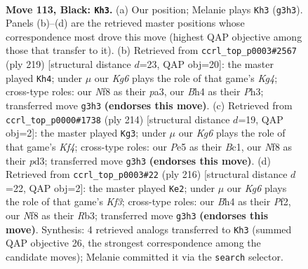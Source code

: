 \documentclass[11pt]{article}
\begin{document}
\clearpage

\begin{figure}[p]\centering
\begin{subfigure}{0.46\textwidth}\centering
\resizebox{\linewidth}{!}{%
\newchessgame
\chessboard[
  setfen={5n2/8/7p/r3p3/1R5b/3p2k1/1K6/8 b - - 23 113},
  showmover=false,
  pgfstyle=straightmove, color=movearrow, markmove={g3-h3}
]}
\caption{}
\end{subfigure}\hfill
\begin{subfigure}{0.46\textwidth}\centering
\resizebox{\linewidth}{!}{%
\newchessgame
\chessboard[
  setfen={8/8/1p6/1p4k1/8/P1K2R1p/7N/4r3 b - - 11 110},
  showmover=false,
  pgfstyle=straightmove, color=movearrow, markmove={g5-h4}
]}
\caption{}
\end{subfigure}
\\[4pt]
\begin{subfigure}{0.46\textwidth}\centering
\resizebox{\linewidth}{!}{%
\newchessgame
\chessboard[
  setfen={8/1R5P/6n1/3k3r/5K2/3p4/8/2B5 w - - 3 108},
  showmover=false,
  pgfstyle=straightmove, color=movearrow, markmove={f4-g3}
]}
\caption{}
\end{subfigure}\hfill
\begin{subfigure}{0.46\textwidth}\centering
\resizebox{\linewidth}{!}{%
\newchessgame
\chessboard[
  setfen={8/8/r4k2/7R/5P2/1R3K2/5P2/6r1 w - - 69 109},
  showmover=false,
  pgfstyle=straightmove, color=movearrow, markmove={f3-e2}
]}
\caption{}
\end{subfigure}
\caption{\textbf{Move 113, Black: \texttt{Kh3}.} (a) Our position; Melanie plays \texttt{Kh3} (\texttt{g3h3}). Panels (b)--(d) are the retrieved master positions whose correspondence most drove this move (highest QAP objective among those that transfer to it). (b) Retrieved from \texttt{ccrl\_top\_p0003\#2567} (ply 219) [structural distance $d$=23, QAP obj=20]: the master played \texttt{Kh4}; under $\mu$ our \emph{Kg6} plays the role of that game's \emph{Kg4}; cross-type roles: our \emph{N}f8 as their \emph{p}a3, our \emph{B}h4 as their \emph{P}h3; transferred move \texttt{g3h3} \textbf{(endorses this move)}. (c) Retrieved from \texttt{ccrl\_top\_p0000\#1738} (ply 214) [structural distance $d$=19, QAP obj=2]: the master played \texttt{Kg3}; under $\mu$ our \emph{Kg6} plays the role of that game's \emph{Kf4}; cross-type roles: our \emph{P}e5 as their \emph{B}c1, our \emph{N}f8 as their \emph{p}d3; transferred move \texttt{g3h3} \textbf{(endorses this move)}. (d) Retrieved from \texttt{ccrl\_top\_p0003\#22} (ply 216) [structural distance $d$=22, QAP obj=2]: the master played \texttt{Ke2}; under $\mu$ our \emph{Kg6} plays the role of that game's \emph{Kf3}; cross-type roles: our \emph{B}h4 as their \emph{P}f2, our \emph{N}f8 as their \emph{R}b3; transferred move \texttt{g3h3} \textbf{(endorses this move)}. Synthesis: 4 retrieved analogs transferred to \texttt{Kh3} (summed QAP objective 26, the strongest correspondence among the candidate moves); Melanie committed it via the \texttt{search} selector.}
\label{fig:thought-m225}
\end{figure}
\end{document}
